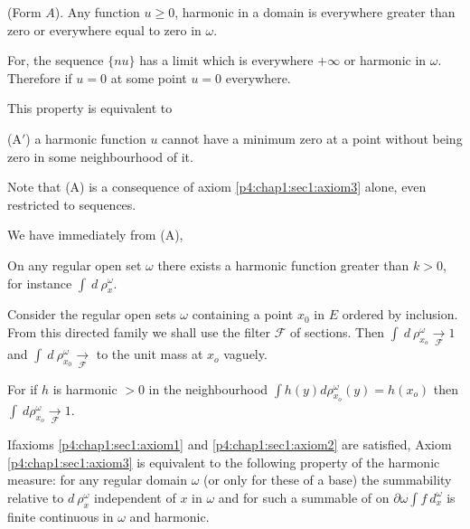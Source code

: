 \setcounter{prop}{0}
\begin{prop}\label{p4:chap1:sec2:prop1} %
  (Form $A$). Any function $u \ge 0$, harmonic in a domain is
  everywhere greater than zero or everywhere equal to zero in
  $\omega$. 
\end{prop}

For, the sequence $\{nu \}$ has a limit which is everywhere $+ \infty$
or harmonic in $\omega$. Therefore if $u = 0$ at some point $u = 0$
everywhere. 

This property is equivalent to 

\noindent (A$'$) a harmonic function $u$ cannot
have a minimum zero at a point without being zero in some
neighbourhood of it. 

Note that (A) is a consequence of axiom
\ref{p4:chap1:sec1:axiom3} alone, even restricted 
to sequences.%

We have immediately from (A),

\setcounter{corollary}{0}
\begin{corollary}\label{p4:chap1:sec3:coro1} %
  On any regular open set $\omega$ there exists a harmonic function
  greater than $k > 0$, for instance $\int ~ d ~ \rho^\omega_x$. 
\end{corollary}

\begin{corollary}\label{p4:chap1:sec3:coro2}%
  Consider the regular open sets $\omega$ containing a point $x_0$ in
  $E$ ordered by inclusion. From this directed family we shall use the
  filter $\mathscr{F}$ of sections. Then $\int ~ d ~ \rho^\omega_{x_o}
  \xrightarrow[\mathscr{F}]{}1$  and $\int ~
  d~\rho^\omega_{x_0}\xrightarrow[\mathscr{F}]{}$ to the unit mass at
  $x_o$ vaguely. 
\end{corollary}

For if $h$ is harmonic $> 0$ in the neighbourhood $\int h(y)d
\rho^\omega_{x_o} (y) = h(x_o)$ then $\int ~ d \rho^\omega_{x_o}
\underset{\mathscr{F}}{\longrightarrow} 1$. 

\setcounter{thm}{0}
\begin{thm}\label{p4:chap1:sec3:thm1} %
  If\pageoriginale axioms \ref{p4:chap1:sec1:axiom1} and
  \ref{p4:chap1:sec1:axiom2} 
   are satisfied, Axiom \ref{p4:chap1:sec1:axiom3} is equivalent to
  the following property of the harmonic measure: for any regular
  domain $\omega$ (or only for these of a base) the summability
  relative to $d ~ \rho^\omega_x$ independent of $x$ in $\omega$ and
  for such a summable of on $\partial \omega \int f ~ d^\omega_x$ is
  finite continuous in $\omega$ and harmonic. 
\end{thm}


